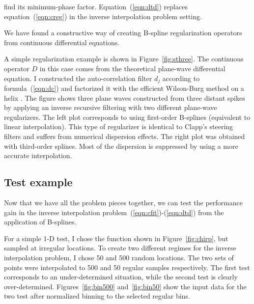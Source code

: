 find its minimum-phase factor. Equation~(\ref{eqn:dtd}) replaces
equation~(\ref{eqn:creg}) in the inverse interpolation problem setting.
\par
We have found a constructive way of creating B-spline regularization
operators from continuous differential equations.
\par
A simple regularization example is shown in Figure~\ref{fig:sthree}.
The continuous operator $D$ in this case comes from the theoretical
plane-wave differential equation.  I constructed the auto-correlation
filter $d_j$ according to formula~(\ref{eqn:dc}) and factorized it
with the efficient Wilson-Burg method on a helix
\cite{Sava.sep.97.paul1}. The figure shows three plane waves
constructed from three distant spikes by applying an inverse recursive
filtering with two different plane-wave regularizers. The left plot
corresponds to using first-order B-splines (equivalent to linear
interpolation). This type of regularizer is identical to Clapp's
steering filters \cite{Clapp.sep.95.bob1} and suffers from numerical
dispersion effects. The right plot was obtained with third-order
splines. Most of the dispersion is suppressed by using a more accurate
interpolation.


\subsection{Test example}

Now that we have all the problem pieces together, we can test the
performance gain in the inverse interpolation
problem~(\ref{eqn:cfit})-(\ref{eqn:dtd}) from the application of B-splines.
\par
For a simple 1-D test, I chose the function shown in
Figure~\ref{fig:chirp}, but sampled at irregular locations. To create two
different regimes for the inverse interpolation problem, I chose 50
and 500 random locations. The two sets of points were interpolated to
500 and 50 regular samples respectively. The first test corresponds to
an under-determined situation, while the second test is clearly
over-determined. Figures~\ref{fig:bin500} and~\ref{fig:bin50} show the
input data for the two test after normalized binning to the selected
regular bins.

